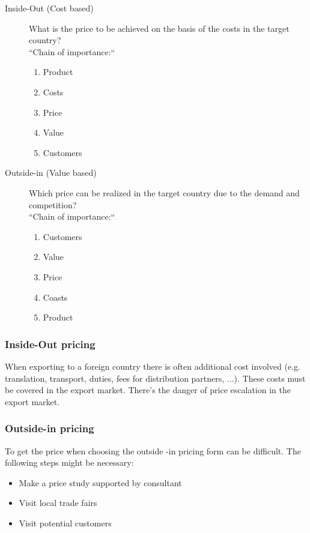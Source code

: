  \begin{description}
 	\item[Inside-Out (Cost based)] What is the price to be achieved on the basis of the costs in the target country?\\
 	“Chain of importance:“
 	\begin{enumerate}
 		\tightlist
 		\item Product
 		\item Costs
 		\item Price
 		\item Value
 		\item Customers
 	\end{enumerate}
 	\item[Outside-in (Value based)] Which price can be realized in the target country due to the demand and competition?\\
 	“Chain of importance:“
 	\begin{enumerate}
 		\tightlist
 		\item Customers
 		\item Value
 		\item Price
 		\item Coasts
 		\item Product
 	\end{enumerate}
 \end{description}

\subsubsection{Inside-Out pricing}
When exporting to a foreign country there is often additional cost involved (e.g. translation, transport, duties, fees for distribution partners, ...). These costs must be covered in the export market. There's the danger of price escalation in the export market.

\subsubsection{Outside-in pricing}
To get the price when choosing the outside -in pricing form can be difficult. The following steps might be necessary:

\begin{itemize}
	\tightlist
	\item Make a price study supported by consultant
	\item Visit local trade fairs
	\item Visit potential customers
\end{itemize}

